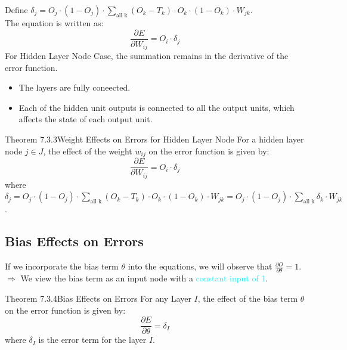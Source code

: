 \documentclass{book}
\begin{document}
Define \(\delta_j = O_j \cdot (1 - O_j) \cdot \sum_{\text{all k}} (O_k - T_k) \cdot O_k \cdot (1 - O_k) \cdot W_{jk}\).\\ The equation is written as:
\[
    \frac{\partial E}{\partial W_{ij}} = O_i \cdot \delta_j
\]
For Hidden Layer Node Case, the summation remains in the derivative of the error function.
\begin{itemize}
    \item The layers are fully coneected.
    \item Each of the hidden unit outputs is connected to all the output units, which affects the state of each output unit.
\end{itemize}
\begin{thmBox}{Theorem 7.3.3}{Weight Effects on Errors for Hidden Layer Node}
    For a hidden layer node \(j \in J\), the effect of the weight \(w_{ij}\) on the error function is given by:
    \[
        \frac{\partial E}{\partial W_{ij}} =  O_i \cdot \delta_j
    \]
    where \(\delta_j = O_j \cdot (1 - O_j) \cdot \sum_{\text{all k}} (O_k - T_k) \cdot O_k \cdot (1 - O_k) \cdot W_{jk} = O_j \cdot (1-O_j) \cdot \sum_{\text{all k}} \delta_k \cdot W_{jk}\).
\end{thmBox}
\subsection{Bias Effects on Errors}
If we incorporate the bias term \(\theta\) into the equations, we will observe that \(\frac{\partial O}{\partial \theta} = 1\).\\
$\Rightarrow$ We view the bias term as an input node with a \textcolor{cyan}{constant input of 1}.\\
\begin{thmBox}{Theorem 7.3.4}{Bias Effects on Errors}
    For any Layer \(I\), the effect of the bias term \(\theta\) on the error function is given by:
    \[
        \frac{\partial E}{\partial \theta} = \delta_I
    \]
    where \(\delta_I\) is the error term for the layer \(I\).
\end{thmBox}
\newpage
\end{document}
